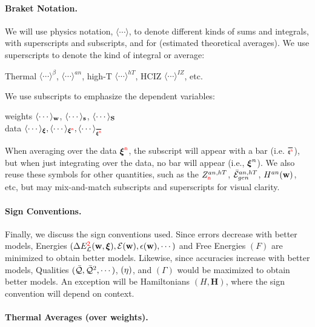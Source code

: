\paragraph{Braket Notation.}
We will use physics \BraKet notation, $\langle\cdots\rangle$,
to denote different kinds of sums and integrals, with superscripts and subscripts,
and for \ExpectedValues (estimated theoretical averages).
We use superscripts to denote the kind of integral or average:
\begin{center}
Thermal $\langle\cdots\rangle^{\beta}$,
\Annealed $\langle\cdots\rangle^{an}$,
high-T $\langle\cdots\rangle^{hT}$,
HCIZ $\langle\cdots\rangle^{IZ}$, etc.
\end{center}
We use subscripts to emphasize the dependent variables:
\begin{center}
  weights $\langle\cdots\rangle_{{\mathbf{w}}}$, $\langle\cdots\rangle_{{\mathbf{s}}}$, $\langle\cdots\rangle_{{\mathbf{S}}}$ \\ \nonumber
    \vspace{0.33cm}  %
data $\langle\cdots\rangle_{\XI},
\langle\cdots\rangle_{\NDXI},
\langle\cdots\rangle_{\AVGNDXI}$
\end{center}
When averaging over the data $\boldsymbol{\xi}^{{\color{red}\sf{n}}}$,  the subscript will appear with a bar (i.e. $\AVGNDXIn$), but when just integrating over the data, no bar will appear (i.e., $\boldsymbol{\xi}^{n}$). 
We also reuse these symbols for other quantities, such as the $Z^{an,hT}_{{\color{red}\sf{n}}}$, $\bar{\mathcal{E}}_{gen}^{an,hT}$, $H^{an}({\mathbf{w}})$, etc,
but may mix-and-match subscripts and superscripts for visual clarity.

\paragraph{Sign Conventions.}
Finally, we discuss the sign conventions used.  Since errors decrease with better models,
Energies $(\Delta E^{{\color{red}\sf{2}}}_{\mathcal{L}}(\mathbf{w},\boldsymbol{\xi}), \mathcal{E}(\mathbf{w}), \epsilon({\mathbf{w}}), \cdots)$ and Free Energies $(F)$ are minimized to obtain better models.
Likewise, since accuracies increase with better models, Qualities $(\bar{\mathcal{Q}}, \bar{\mathcal{Q}}^{2}, \cdots)$,
\SelfOverlap $(\eta)$, and \Quality \GeneratingFunction $(\Gamma)$ would be maximized to obtain better models.
An exception will be Hamiltonians $(H,\mathbf{H})$, where the sign convention will depend on context.

\paragraph{Thermal Averages (over weights).}

